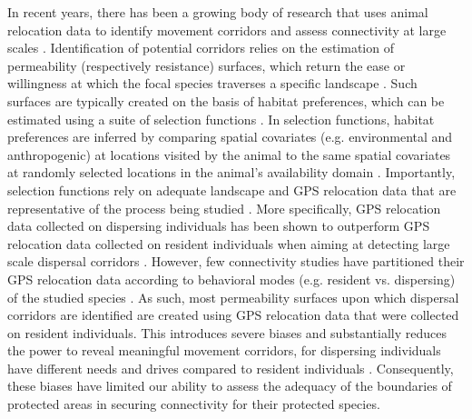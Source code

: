 \documentclass[abstract=on,10pt,a4paper,bibliography=totocnumbered]{article}
\begin{document}
In recent years, there has been a growing body of research that uses animal
relocation data to identify movement corridors and assess connectivity at large
scales \citep{Chetkiewicz.2006, Doerr.2011, Squires.2013, Elliot.2014,
Benz.2016, Osipova.2019}. Identification of potential corridors relies on the
estimation of permeability (respectively resistance) surfaces, which return the
ease or willingness at which the focal species traverses a specific landscape
\citep{Sawyer.2011}. Such surfaces are typically created on the basis of habitat
preferences, which can be estimated using a suite of selection functions
\citep{Boyce.2002, Fortin.2005, Cushman.2010}. In selection functions, habitat
preferences are inferred by comparing spatial covariates (e.g. environmental and
anthropogenic) at locations visited by the animal to the same spatial covariates
at randomly selected locations in the animal's availability domain
\citep{Zeller.2012, Thurfjell.2014}. Importantly, selection functions rely on
adequate landscape and GPS relocation data that are representative of the
process being studied \citep{Diniz.2020}. More specifically, GPS relocation data
collected on dispersing individuals has been shown to outperform GPS relocation
data collected on resident individuals when aiming at detecting large scale
dispersal corridors \citep{Elliot.2014, Diniz.2020}. However, few connectivity
studies have partitioned their GPS relocation data according to behavioral modes
(e.g. resident vs. dispersing) of the studied species \citep{Wilson.2012,
Vasudev.2015}. As such, most permeability surfaces upon which dispersal
corridors are identified are created using GPS relocation data that were
collected on resident individuals. This introduces severe biases and
substantially reduces the power to reveal meaningful movement corridors, for
dispersing individuals have different needs and drives compared to resident
individuals \citep{Killeen.2014, Elliot.2014, Cozzi.2020}. Consequently, these
biases have limited our ability to assess the adequacy of the boundaries of
protected areas in securing connectivity for their protected species.
\end{document}
